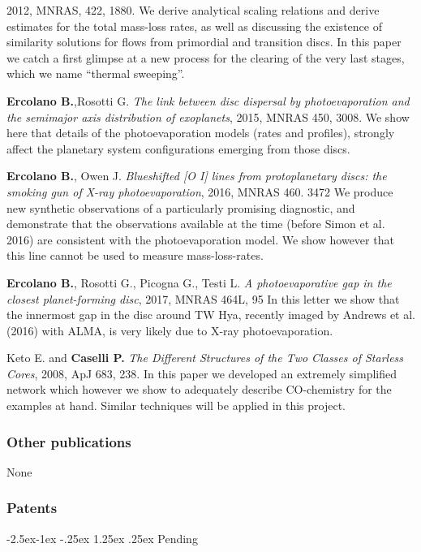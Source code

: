\documentclass[10pt,fleqn,twoside]{article}
\makeatletter
\newenvironment{literature}%
 {\begin{multicols}{2}\begin{scriptsize}\begin{list}{}{%
   \setlength{\topsep}{0em}%
   \setlength{\parskip}{0em}%
   \setlength{\parsep}{0em}%
   \setlength{\itemsep}{0em}%
   \setlength{\rightmargin}{0em}%
   \setlength{\leftmargin}{2em}%
   \setlength{\itemindent}{-2em}}}%
 {\end{list}\end{scriptsize}\end{multicols}}
\newcommand{\Tcol}{\color{blue}}
\renewcommand\paragraph{\@startsection{paragraph}{4}{\z@}%
            {-2.5ex\@plus -1ex \@minus -.25ex}%
            {1.25ex \@plus .25ex}%
            {\normalfont\normalsize\bfseries}}
\makeatother
\begin{document}
\begin{literature}
  2012, MNRAS, 422, 1880. We derive analytical scaling relations and
  derive estimates for the total mass-loss rates, as well as
  discussing the existence of similarity solutions for flows from
  primordial and transition discs. In this paper we catch a first
  glimpse at a new process for the clearing of the very last stages,
  which we name ``thermal sweeping''.
\item \textbf{Ercolano B.},Rosotti G. {\em The link between disc
    dispersal by photoevaporation and the semimajor axis distribution
    of exoplanets}, 2015, MNRAS 450,
  3008. We show here that details of the photoevaporation models
  (rates and profiles), strongly affect the planetary system
  configurations emerging from those discs. 
\item \textbf{Ercolano B.}, Owen J.  {\em Blueshifted [O I] lines from
    protoplanetary discs: the smoking gun of X-ray photoevaporation},
  2016, MNRAS 460. 3472
  We produce new synthetic observations of a particularly promising
  diagnostic, and demonstrate that the observations available at the
  time (before Simon et al. 2016) are consistent with the
  photoevaporation model. We show however that this line cannot be
  used to measure mass-loss-rates. 
\item \textbf{Ercolano B.}, Rosotti G., Picogna G., Testi L.  {\em A photoevaporative gap in the closest planet-forming disc},
  2017, MNRAS 464L, 95
 In this letter we show that the innermost gap in the disc around TW
 Hya, recently imaged by Andrews et al. (2016) with ALMA, is very
 likely due to X-ray photoevaporation. 
\item Keto E. and \textbf{Caselli P.}  \textit{The Different Structures of the Two Classes of Starless Cores}, 2008, ApJ
  683, 238. In this paper we developed an extremely simplified network
  which however we show to adequately describe CO-chemistry for the
  examples at hand. Similar techniques will be applied in this
  project. 
\end{literature}


\subsubsection{\Tcol Other publications}

None 
\subsubsection{\Tcol Patents}

\paragraph{\Tcol Pending}
\end{document}
